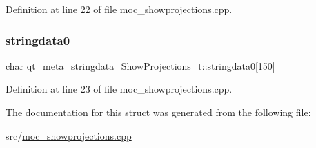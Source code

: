 Definition at line 22 of file moc\+\_\+showprojections.\+cpp.

\mbox{\label{structqt__meta__stringdata___show_projections__t_ac38af3ba9c6d74086b384b5d28cfa298}} 
\subsubsection{\texorpdfstring{stringdata0}{stringdata0}}
{\footnotesize\ttfamily char qt\+\_\+meta\+\_\+stringdata\+\_\+\+Show\+Projections\+\_\+t\+::stringdata0\mbox{[}150\mbox{]}}



Definition at line 23 of file moc\+\_\+showprojections.\+cpp.



The documentation for this struct was generated from the following file\+:\begin{DoxyCompactItemize}
\item 
src/\mbox{\hyperlink{moc__showprojections_8cpp}{moc\+\_\+showprojections.\+cpp}}\end{DoxyCompactItemize}
